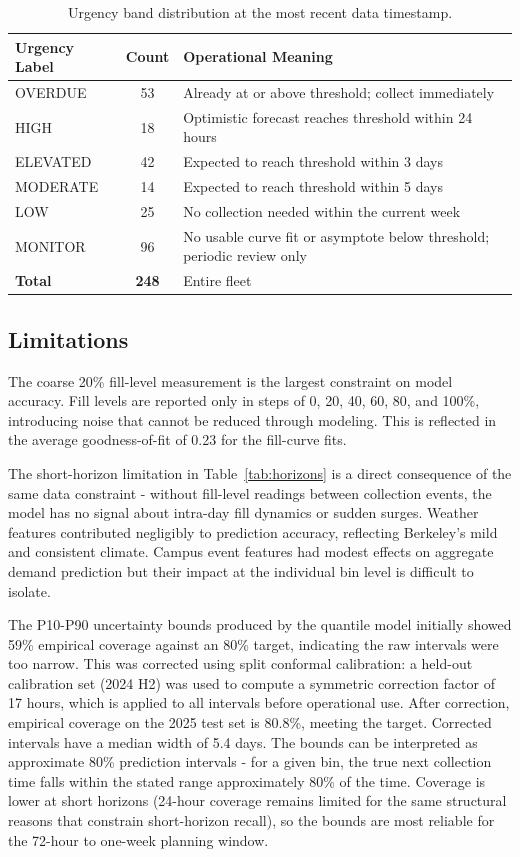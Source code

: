 \documentclass[11pt]{article}
\begin{document}
\begin{table}[ht]
\centering
\caption{Urgency band distribution at the most recent data timestamp.}
\label{tab:urgency_band_distribution}
\begin{tabular}{l c p{8cm}}
\hline
\textbf{Urgency Label} & \textbf{Count} & \textbf{Operational Meaning} \\
\hline
OVERDUE  & 53 & Already at or above threshold; collect immediately \\
HIGH     & 18 & Optimistic forecast reaches threshold within 24 hours \\
ELEVATED & 42 & Expected to reach threshold within 3 days \\
MODERATE & 14 & Expected to reach threshold within 5 days \\
LOW      & 25 & No collection needed within the current week \\
MONITOR  & 96 & No usable curve fit or asymptote below threshold; periodic review only \\
\hline
\textbf{Total} & \textbf{248} & Entire fleet \\
\hline
\end{tabular}
\end{table}

\subsection{Limitations}

The coarse 20\% fill-level measurement is the largest constraint on model accuracy. Fill
levels are reported only in steps of 0, 20, 40, 60, 80, and 100\%, introducing noise that
cannot be reduced through modeling. This is reflected in the average goodness-of-fit of
0.23 for the fill-curve fits.

The short-horizon limitation in Table~\ref{tab:horizons} is a direct consequence of the
same data constraint - without fill-level readings between collection events, the model
has no signal about intra-day fill dynamics or sudden surges. Weather features contributed
negligibly to prediction accuracy, reflecting Berkeley's mild and consistent climate.
Campus event features had modest effects on aggregate demand prediction but their impact
at the individual bin level is difficult to isolate.

The P10-P90 uncertainty bounds produced by the quantile model initially showed 59\%
empirical coverage against an 80\% target, indicating the raw intervals were too narrow.
This was corrected using split conformal calibration: a held-out calibration set (2024 H2)
was used to compute a symmetric correction factor of 17 hours, which is applied to all
intervals before operational use. After correction, empirical coverage on the 2025 test
set is 80.8\%, meeting the target. Corrected intervals have a median width of 5.4 days.
The bounds can be interpreted as approximate 80\% prediction intervals - for a given bin,
the true next collection time falls within the stated range approximately 80\% of the
time. Coverage is lower at short horizons (24-hour coverage remains limited for the same
structural reasons that constrain short-horizon recall), so the bounds are most reliable
for the 72-hour to one-week planning window.
\end{document}
